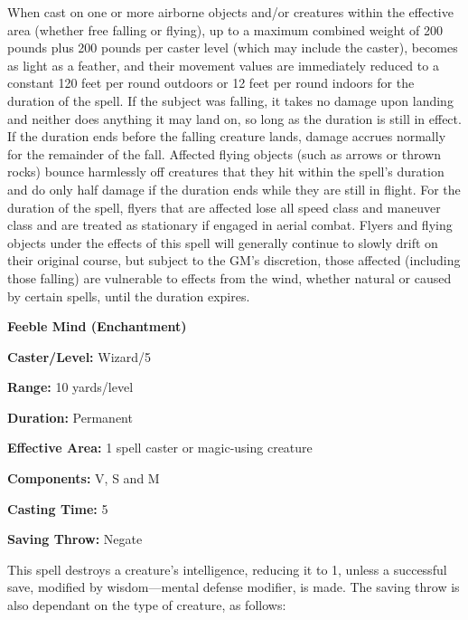 \begin{multicols}{2}
When cast on one or more airborne objects and/or creatures within the effective area (whether free falling or flying), up to a maximum combined weight of 200 pounds plus 200 pounds per caster level (which may include the caster), becomes as light as a feather, and their movement values are immediately reduced to a constant 120 feet per round outdoors or 12 feet per round indoors for the duration of the spell.  If the subject was falling, it takes no damage upon landing and neither does anything it may land on, so long as the duration is still in effect.  If the duration ends before the falling creature lands, damage accrues normally for the remainder of the fall. Affected flying objects (such as arrows or thrown rocks) bounce harmlessly off creatures that they hit within the spell's duration and do only half damage if the duration ends while they are still in flight.  For the duration of the spell, flyers that are affected lose all speed class and maneuver class and are treated as stationary if engaged in aerial combat.  Flyers and flying objects under the effects of this spell will generally continue to slowly drift on their original course, but subject to the GM's discretion, those affected (including those falling) are vulnerable to effects from the wind, whether natural or caused by certain spells, until the duration expires.

\vspace{1em}

\noindent
\begin{minipage}{\columnwidth}

\noindent \textbf{Feeble Mind (Enchantment)}

\noindent \textbf{Caster/Level:} Wizard/5

\noindent \textbf{Range:} 10 yards/level

\noindent \textbf{Duration:} Permanent

\noindent \textbf{Effective Area:} 1 spell caster or magic-using creature

\noindent \textbf{Components:} V, S and M

\noindent \textbf{Casting Time:} 5

\noindent \textbf{Saving Throw:} Negate

\end{minipage}

This spell destroys a creature's intelligence, reducing it to 1, unless a successful save, modified by wisdom---mental defense modifier, is made.  The saving throw is also dependant on the type of creature, as follows:


\end{multicols}

